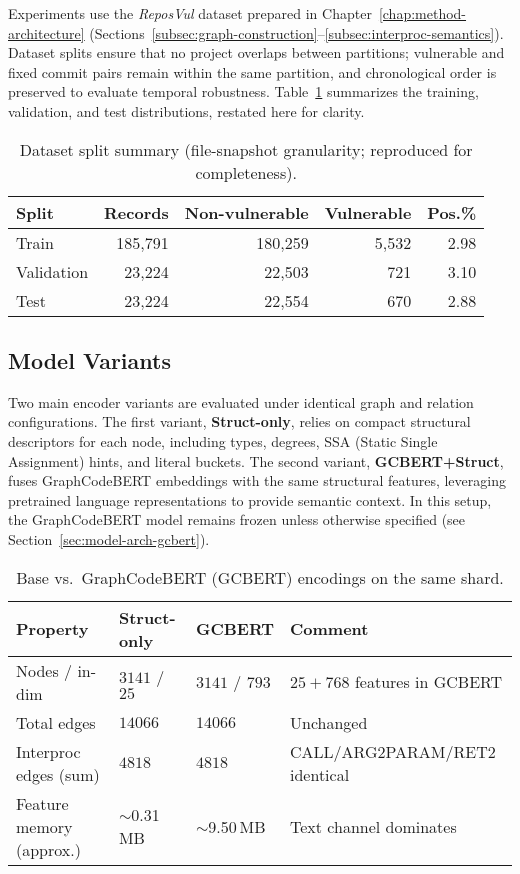 \documentclass{buthesis}
\begin{document}
Experiments use the \emph{ReposVul} dataset prepared in Chapter~\ref{chap:method-architecture} (Sections~\ref{subsec:graph-construction}--\ref{subsec:interproc-semantics}). Dataset splits ensure that no project overlaps between partitions; vulnerable and fixed commit pairs remain within the same partition, and chronological order is preserved to evaluate temporal robustness. Table~\ref{tab:results-split-summary} summarizes the training, validation, and test distributions, restated here for clarity.

\begin{table}[H]
\centering
\small
\setlength{\tabcolsep}{8pt}
\renewcommand{\arraystretch}{1.10}
\caption{Dataset split summary (file-snapshot granularity; reproduced for completeness).}
\label{tab:results-split-summary}
\begin{tabular}{lrrrr}
\toprule
\textbf{Split} & \textbf{Records} & \textbf{Non-vulnerable} & \textbf{Vulnerable} & \textbf{Pos.\%} \\
\midrule
Train & 185{,}791 & 180{,}259 & 5{,}532 & 2.98 \\
Validation & 23{,}224 & 22{,}503 & 721 & 3.10 \\
Test & 23{,}224 & 22{,}554 & 670 & 2.88 \\
\bottomrule
\end{tabular}
\end{table}

\subsection{Model Variants}
\label{subsec:results-variants}

Two main encoder variants are evaluated under identical graph and relation configurations. The first variant, \textbf{Struct-only}, relies on compact structural descriptors for each node, including types, degrees, SSA (Static Single Assignment) hints, and literal buckets. The second variant, \textbf{GCBERT+Struct}, fuses GraphCodeBERT embeddings with the same structural features, leveraging pretrained language representations to provide semantic context. In this setup, the GraphCodeBERT model remains frozen unless otherwise specified (see Section~\ref{sec:model-arch-gcbert}).

\begin{table}[H]
\centering
\small
\setlength{\tabcolsep}{6pt}
\renewcommand{\arraystretch}{1.12}
\caption{Base vs.\ GraphCodeBERT (GCBERT) encodings on the same shard.}
\label{tab:gcbert-topology}
\begin{tabular}{llll}
\toprule
\textbf{Property} & \textbf{Struct-only} & \textbf{GCBERT} & \textbf{Comment} \\
\midrule
Nodes / in-dim & $3141$ / $25$ & $3141$ / $793$ & $25{+}768$ features in GCBERT \\
Total edges & $14066$ & $14066$ & Unchanged \\
Interproc edges (sum) & $4818$ & $4818$ & CALL/ARG2PARAM/RET2\* identical \\
Feature memory (approx.) & $\sim$0.31\,MB & $\sim$9.50\,MB & Text channel dominates \\
\bottomrule
\end{tabular}
\end{table}
\end{document}

